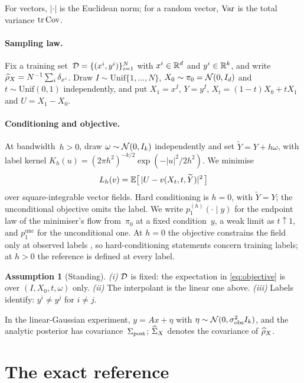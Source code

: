 \documentclass{article} %
\theoremstyle{plain}
\theoremstyle{definition}
\newtheorem{assumption}{Assumption}
\theoremstyle{remark}
\begin{document}
For vectors, $|\cdot|$ is the Euclidean norm; for a random vector, $\operatorname{Var}$ is the total
variance $\operatorname{tr}\operatorname{Cov}$.

\paragraph{Sampling law.} Fix a training set~$\mathcal{D}=\{(x^i,y^i)\}_{i=1}^N$ with $x^i\in\mathbb{R}^d$ and
$y^i\in\mathbb{R}^k$, and write $\widehat{\rho}_X=N^{-1}\sum_i\delta_{x^i}$. Draw $I\sim\mathrm{Unif}\{1,\dots,N\}$,
$X_0\sim\pi_0=\mathcal{N}(0,I_d)$ and $t\sim\mathrm{Unif}(0,1)$ independently, and put $X_1=x^I$, $Y=y^I$,
$X_t=(1-t)X_0+tX_1$ and $U=X_1-X_0$.

\paragraph{Conditioning and objective.} At bandwidth~$h>0$, draw $\omega\sim\mathcal{N}(0,I_k)$
independently and set $\widetilde Y=Y+h\omega$, with label kernel
$K_h(u)=(2\pi h^2)^{-k/2}\exp(-|u|^2/2h^2)$. We minimise
\begin{equation}
L_h(v)=\mathbb{E}\big[\,|U-v(X_t,t,\widetilde Y)|^2\,\big]
\label{eq:objective}
\end{equation}
over square-integrable vector fields. Hard conditioning is $h=0$, with $\widetilde Y=Y$; the
unconditional objective omits the label. We write $p_1^{(h)}(\cdot\mid y)$ for the endpoint law
of the minimiser's flow from~$\pi_0$ at a fixed condition~$y$, a weak limit as $t\uparrow1$,
and $p_1^{\mathrm{unc}}$ for the unconditional one. At $h=0$ the objective constrains the field
only at observed labels \citep[Theorem~6.4]{baptista2025memorization}, so hard-conditioning
statements concern training labels; at $h>0$ the reference is defined at every label.

\begin{assumption}[Standing]
\label{as:standing}
\emph{(i)} $\mathcal{D}$ is fixed: the expectation in \eqref{eq:objective} is over
$(I,X_0,t,\omega)$ only. \emph{(ii)} The interpolant is the linear one above.
\emph{(iii)} Labels identify: $y^i\neq y^j$ for $i\neq j$.
\end{assumption}

In the linear-Gaussian experiment, $y=Ax+\eta$ with $\eta\sim\mathcal{N}(0,\sigma_{\mathrm{obs}}^2I_k)$,
and the analytic posterior has covariance~$\Sigma_{\mathrm{post}}$; $\widehat{\Sigma}_X$ denotes the covariance of
$\widehat{\rho}_X$.

\section{The exact reference}
\label{sec:theory}
\end{document}
